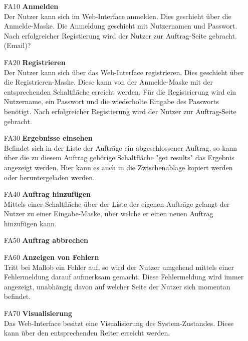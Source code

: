 \begin{itemize}
     \item[FA10] \textbf{Anmelden} \\
        Der Nutzer kann sich im Web-Interface anmelden. Dies geschieht über die Anmelde-Maske. Die Anmeldung geschieht mit Nutzernamen und Passwort. Nach erfolgreicher Registierung wird der Nutzer zur Auftrag-Seite gebracht.(Email)?
     \item[FA20] \textbf{Registrieren} \\
        Der Nutzer kann sich über das Web-Interface registrieren. Dies geschieht über die Registrieren-Maske. Diese kann von der Anmelde-Maske mit der entsprechenden Schaltfläche erreicht werden. Für die Registrierung wird ein Nutzername, ein Passwort und die wiederholte Eingabe des Passworts benötigt. Nach erfolgreicher Registierung wird der Nutzer zur Auftrag-Seite gebracht.
    \item[FA30] \textbf{Ergebnisse einsehen} \\
        Befindet sich in der Liste der Aufträge ein abgeschlossener Auftrag, so kann über die zu diesem Auftrag gehörige Schaltfläche "get results" das Ergebnis angezeigt werden. Hier kann es auch in die Zwischenablage kopiert werden oder heruntergeladen werden.
   \item[FA40] \textbf{Auftrag hinzufügen} \\ 
        Mittels einer Schaltfläche über der Liste der eigenen Aufträge gelangt der Nutzer zu einer Eingabe-Maske, über welche er einen neuen Auftrag hinzufügen kann. 
   \item[FA50] \textbf{Auftrag abbrechen} \\
   
   \item[FA60] \textbf{Anzeigen von Fehlern} \\
        Tritt bei Mallob ein Fehler auf, so wird der Nutzer umgehend mittels einer Fehlermeldung darauf aufmerksam gemacht. Diese Fehlermeldung wird immer angezeigt, unabhängig davon auf welcher Seite der Nutzer sich momentan befindet. 
    \item[FA70] \textbf{Visualisierung} \\
        Das Web-Interface besitzt eine Visualisierung des System-Zustandes. Diese kann über den entsprechenden Reiter erreicht werden.
        

\end{itemize}
